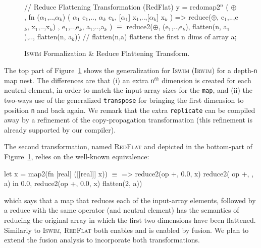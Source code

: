 \documentclass{sigplanconf}  %
\newcommand{\emp}[1]{\textcolor{DikuRed}{ #1}}
\newcommand{\emphh}[1]{\textcolor{CosGreen}{ #1}}
\newcommand{\mymath}[1]{$ #1 $}
\newcommand{\myindx}[1]{_{#1}}
\newcommand{\myindu}[1]{^{#1}}
\begin{document}
\begin{figure}[bt]
{\begin{colorcode}
// \emp{Reduce Flattening Transformation (RedFlat)}
y = redomap2\mymath{\myindu{n}} ( \mymath{\oplus} 
               , fn (\mymath{\alpha\myindx{1}},..,\mymath{\alpha\myindx{k}}) ( \mymath{\alpha\myindx{1}} e\mymath{\myindx{1}},..,  \mymath{\alpha\myindx{k}} e\mymath{\myindx{k}},
                                [\mymath{\alpha\myindx{1}}] x\mymath{\myindx{1}},..,[\mymath{\alpha\myindx{k}}] x\mymath{\myindx{k}} ) => 
                     reduce(\mymath{\oplus}, e\mymath{\myindx{1}},..,e\mymath{\myindx{k}}, x\mymath{\myindx{1}},..,x\mymath{\myindx{k}})
               , e\mymath{\myindx{1}},..,e\mymath{\myindx{k}}, a\mymath{\myindx{1}},..,a\mymath{\myindx{k}} )
        \emphh{\mymath{\equiv}}
reduce2(\mymath{\oplus}, (e\mymath{\myindx{1}},..,e\mymath{\myindx{k}}), flatten(n, a\mymath{\myindx{1}}),.., flatten(n, a\mymath{\myindx{k}}))
// flatten(n,a) flattens the first n dims of array a;
\end{colorcode}
} \vspace{-2ex}
\caption{\textsc{Iswim} Formalization \& Reduce Flattening Transform.}
\label{fig:TransfGen}
\end{figure}

The top part of Figure~\ref{fig:TransfGen} shows the generalization
for \textsc{Iswim} (\textsc{Irwim}) for a depth-{\tt n} map nest.   
The differences are that (i) an extra {\tt n$^{th}$} dimension is 
created for each neutral element, in order to match the input-array 
sizes for the {\tt map},  and (ii) the two-ways use of the generalized 
{\tt transpose} for bringing the first dimension to position {\tt n}
and back again. We remark that the extra {\tt replicate} can be compiled
away by a refinement of the copy-propagation transformation 
(this refinement is already supported by our compiler).

The second transformation, named \textsc{RedFlat} and depicted in the 
bottom-part of Figure~\ref{fig:TransfGen}, relies on the well-known equivalence:
\begin{colorcode}
let x = map2(fn [real] ([[real]] x))  \emphh{\mymath{\equiv}}
              => reduce2(op +, 0.0, x)   reduce2( op +, 
            , a) in                               0.0,
reduce2(op +, 0.0, x)                      flatten(2, a))
\end{colorcode}
\noindent which says that a map that reduces each of the input-array 
elements, followed by a reduce with the same operator (and neutral element)
has the semantics of reducing the original array in which the first two 
dimensions have been flattened. 
Similarly to \textsc{Iswim}, \textsc{RedFlat} both enables and is enabled 
by fusion. We plan to extend the fusion analysis to incorporate both 
transformations.
\end{document}
